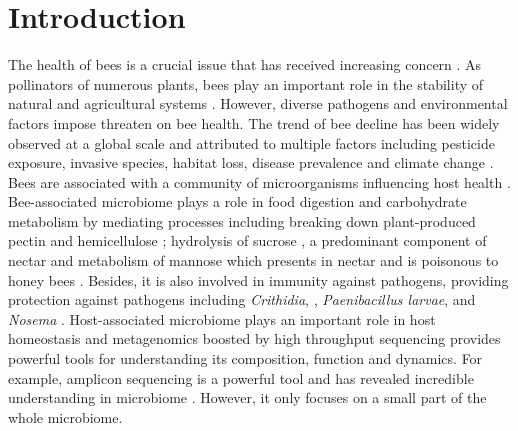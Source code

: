 \documentclass[11pt]{article}
\begin{document}
  \section{Introduction}
  The health of bees is a crucial issue that has received increasing concern \citep{amiri2020using}. 
  As pollinators of numerous plants, bees play an important role in the stability of natural and agricultural systems \citep{hristov2020significance,foldesi2021larger,bansch2021crop,khalifa2021overview}. 
  However, diverse pathogens and environmental factors impose threaten on bee health. 
  The trend of bee decline has been widely observed at a global scale and attributed to multiple factors including pesticide exposure, invasive species, habitat loss, disease prevalence and climate change \citep{brown2009conservation,hristov2020factors,cheng2021ecology,zattara2021worldwide}.
  \newline
  Bees are associated with a community of microorganisms influencing host health \citep{engel2016bee,raymann2018role}. 
  Bee-associated microbiome plays a role in food digestion and carbohydrate metabolism by mediating processes including breaking down 
  plant-produced pectin and hemicellulose \citep{zheng2019division}; hydrolysis of sucrose \citep{engel2012functional,lee2015saccharide}, a predominant component of nectar \citep{nicolson2007nectar} and metabolism of mannose \citep{engel2012functional,lee2015saccharide} which presents in nectar 
  \citep{adler2000ecological} and is poisonous to honey bees \citep{de1986mechanism}. 
  Besides, it is also involved in immunity against pathogens, providing protection against pathogens including \textit{Crithidia}, 
  \citep{koch2011socially,cariveau2014variation}, \textit{Paenibacillus larvae}, 
  \citep{ebeling2016biology,forsgren2010novel} and \textit{Nosema} 
  \citep{cariveau2014variation,maes2016diet}.
  \newline
  Host-associated microbiome plays an important role in host homeostasis and metagenomics boosted by high throughput sequencing provides powerful tools for understanding its composition, function and dynamics. 
  For example, amplicon sequencing is a powerful tool and has revealed incredible understanding in microbiome \citep{eckburg2005diversity,galloway2020tools,new2020metagenomics}. 
  However, it only focuses on a small part of the whole microbiome. 
\end{document}
